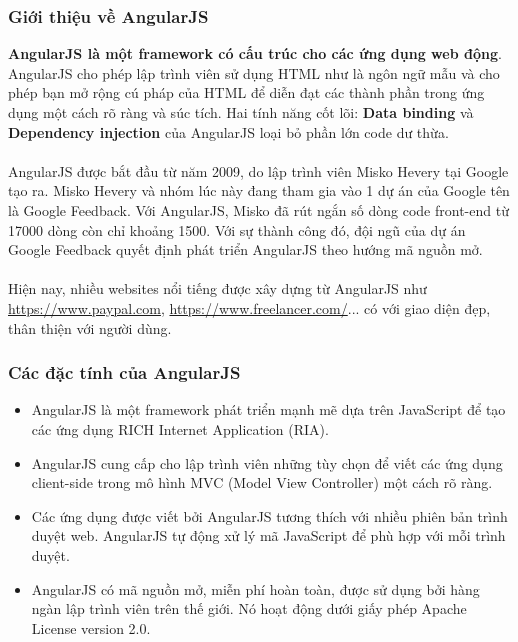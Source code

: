 \documentclass[a4paper]{article}
\begin{document}
\subsubsection{Giới thiệu về AngularJS}
\textbf{AngularJS là một framework có cấu trúc cho các ứng dụng web động}. AngularJS cho phép lập trình viên sử dụng HTML như là ngôn ngữ mẫu và cho phép bạn mở rộng cú pháp của HTML để diễn đạt các thành phần trong ứng dụng một cách rõ ràng và súc tích. Hai tính năng cốt lõi: \textbf{Data binding} và \textbf{Dependency injection} của AngularJS loại bỏ phần lớn code dư thừa.\\
\\
AngularJS được bắt đầu từ năm 2009, do lập trình viên Misko Hevery tại Google tạo ra. Misko Hevery và nhóm lúc này đang tham gia vào 1 dự án của Google tên là Google Feedback. Với AngularJS, Misko đã rút ngắn số dòng code front-end từ 17000 dòng còn chỉ khoảng 1500. Với sự thành công đó, đội ngũ của dự án Google Feedback quyết định phát triển AngularJS theo hướng mã nguồn mở.\\
\\
Hiện nay, nhiều websites nổi tiếng được xây dựng từ AngularJS như \url{https://www.paypal.com}, \url{https://www.freelancer.com/}... có với giao diện đẹp, thân thiện với người dùng.
%
\subsubsection{Các đặc tính của AngularJS}
\begin{itemize}
	\item AngularJS là một framework phát triển mạnh mẽ dựa trên JavaScript để tạo các ứng dụng RICH Internet Application (RIA).

	\item AngularJS cung cấp cho lập trình viên những tùy chọn để viết các ứng dụng client-side trong mô hình MVC (Model View Controller) một cách rõ ràng.

	\item Các ứng dụng được viết bởi AngularJS tương thích với nhiều phiên bản trình duyệt web. AngularJS tự động xử lý mã JavaScript để phù hợp với mỗi trình duyệt.

	\item AngularJS có mã nguồn mở, miễn phí hoàn toàn, được sử dụng bởi hàng ngàn lập trình viên trên thế giới. Nó hoạt động dưới giấy phép Apache License version 2.0.
\end{itemize}
\end{document}
